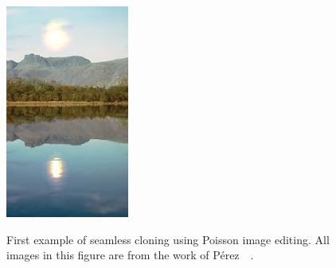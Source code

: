 \documentclass[11pt]{hyu_thesis}
\begin{document}
\begin{figure}
{		\includegraphics[height=0.28\textheight]{poisson_seamless_cloning1.eps}
	}
	\caption{First example of seamless cloning using Poisson image editing. All images in this figure are from the work of P{\'e}rez~\etal~\cite{Perez2003}.}
	\label{fig:seamless_cloning1}
\end{figure}
\end{document}
